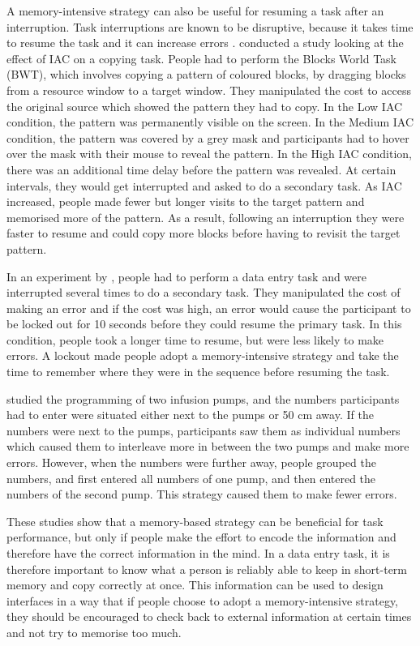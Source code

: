\documentclass[11pt,oneside]{report}
\begin{document}
A memory-intensive strategy can also be useful for resuming a task after an interruption. Task interruptions are known to be disruptive, because it takes time to resume the task and it can increase errors \citep{Back2010, Brumby2013, Morgan2009}. 
\citet{Morgan2009} conducted a study looking at the effect of IAC on a copying task. People had to perform the Blocks World Task (BWT), which involves copying a pattern of coloured blocks, by dragging blocks from a resource window to a target window. They manipulated the cost to access the original source which showed the pattern they had to copy. In the Low IAC condition, the pattern was permanently visible on the screen. In the Medium IAC condition, the pattern was covered by a grey mask and participants had to hover over the mask with their mouse to reveal the pattern. In the High IAC condition, there was an additional time delay before the pattern was revealed. At certain intervals, they would get interrupted and asked to do a secondary task. As IAC increased, people made fewer but longer visits to the target pattern and memorised more of the pattern. As a result, following an interruption they were faster to resume and could copy more blocks before having to revisit the target pattern. 

In an experiment by \citet{Brumby2013}, people had to perform a data entry task and were interrupted several times to do a secondary task. They manipulated the cost of making an error and if the cost was high, an error would cause the participant to be locked out for 10 seconds before they could resume the primary task. In this condition, people took a longer time to resume, but were less likely to make errors. A lockout made people adopt a memory-intensive strategy and take the time to remember where they were in the sequence before resuming the task. 

\citet{Back2012} studied the programming of two infusion pumps, and the numbers participants had to enter were situated either next to the pumps or 50 cm away. If the numbers were next to the pumps, participants saw them as individual numbers which caused them to interleave more in between the two pumps and make more errors. 
However, when the numbers were further away, people grouped the numbers, and first entered all numbers of one pump, and then entered the numbers of the second pump. This strategy caused them to make fewer errors. 

These studies show that a memory-based strategy can be beneficial for task performance, but only if people make the effort to encode the information and therefore have the correct information in the mind. In a data entry task, it is therefore important to know what a person is reliably able to keep in short-term memory and copy correctly at once. This information can be used to design interfaces in a way that if people choose to adopt a memory-intensive strategy, they should be encouraged to check back to external information at certain times and not try to memorise too much.
\end{document}
